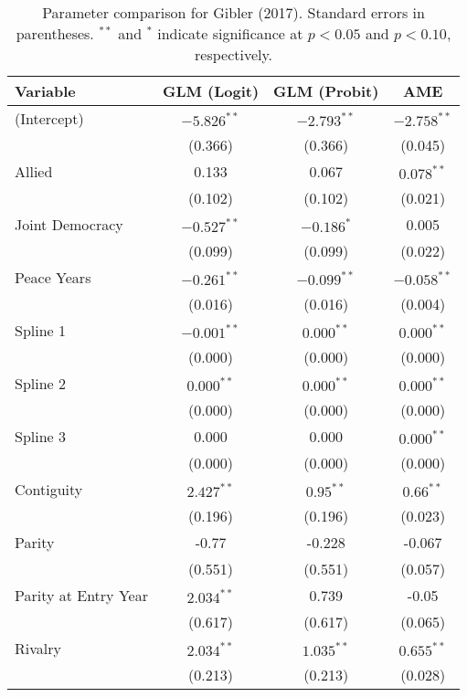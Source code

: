 \begin{table}[ht]
\centering
\begingroup\normalsize
\begin{tabular}{lccc}
 Variable & GLM (Logit) & GLM (Probit) & AME \\ 
  \hline
\hline
(Intercept) & $-5.826^{\ast\ast}$ & $-2.793^{\ast\ast}$ & $-2.758^{\ast\ast}$ \\ 
   & (0.366) & (0.366) & (0.045) \\ 
  Allied & 0.133 & 0.067 & $0.078^{\ast\ast}$ \\ 
   & (0.102) & (0.102) & (0.021) \\ 
  Joint Democracy & $-0.527^{\ast\ast}$ & $-0.186^{\ast}$ & 0.005 \\ 
   & (0.099) & (0.099) & (0.022) \\ 
  Peace Years & $-0.261^{\ast\ast}$ & $-0.099^{\ast\ast}$ & $-0.058^{\ast\ast}$ \\ 
   & (0.016) & (0.016) & (0.004) \\ 
  Spline 1 & $-0.001^{\ast\ast}$ & $0.000^{\ast\ast}$ & $0.000^{\ast\ast}$ \\ 
   & (0.000) & (0.000) & (0.000) \\ 
  Spline 2 & $0.000^{\ast\ast}$ & $0.000^{\ast\ast}$ & $0.000^{\ast\ast}$ \\ 
   & (0.000) & (0.000) & (0.000) \\ 
  Spline 3 & 0.000 & 0.000 & $0.000^{\ast\ast}$ \\ 
   & (0.000) & (0.000) & (0.000) \\ 
  Contiguity & $2.427^{\ast\ast}$ & $0.95^{\ast\ast}$ & $0.66^{\ast\ast}$ \\ 
   & (0.196) & (0.196) & (0.023) \\ 
  Parity & -0.77 & -0.228 & -0.067 \\ 
   & (0.551) & (0.551) & (0.057) \\ 
  Parity at Entry Year & $2.034^{\ast\ast}$ & 0.739 & -0.05 \\ 
   & (0.617) & (0.617) & (0.065) \\ 
  Rivalry & $2.034^{\ast\ast}$ & $1.035^{\ast\ast}$ & $0.655^{\ast\ast}$ \\ 
   & (0.213) & (0.213) & (0.028) \\ 
   \hline
\hline
\end{tabular}
\endgroup
\caption{Parameter comparison for Gibler (2017). Standard errors in parentheses. $^{**}$ and $^{*}$ indicate significance at $p<0.05$ and $p<0.10$, respectively.} 
\label{tab:gibler_coef}
\end{table}